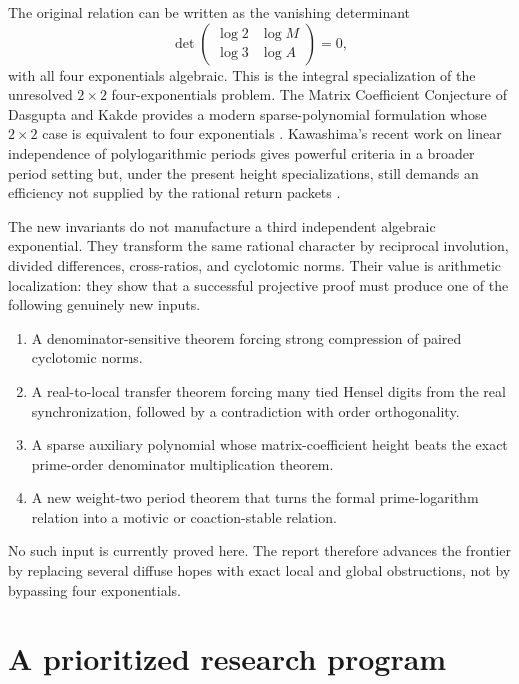 \documentclass[11pt]{article}
\theoremstyle{definition}
\theoremstyle{remark}
\begin{document}
The original relation can be written as the vanishing determinant
\begin{equation}\label{eq:four-exp-matrix}
 \det\begin{pmatrix}
 \log2&\log M\\
 \log3&\log A
 \end{pmatrix}=0,
\end{equation}
with all four exponentials algebraic.  This is the integral specialization of the unresolved $2\times2$ four-exponentials problem.  The Matrix Coefficient Conjecture of Dasgupta and Kakde provides a modern sparse-polynomial formulation whose $2\times2$ case is equivalent to four exponentials \cite{DasguptaKakde}.  Kawashima's recent work on linear independence of polylogarithmic periods gives powerful criteria in a broader period setting but, under the present height specializations, still demands an efficiency not supplied by the rational return packets \cite{Kawashima}.

The new invariants do not manufacture a third independent algebraic exponential.  They transform the same rational character by reciprocal involution, divided differences, cross-ratios, and cyclotomic norms.  Their value is arithmetic localization: they show that a successful projective proof must produce one of the following genuinely new inputs.

\begin{enumerate}
\item A denominator-sensitive theorem forcing strong compression of paired cyclotomic norms.
\item A real-to-local transfer theorem forcing many tied Hensel digits from the real synchronization, followed by a contradiction with order orthogonality.
\item A sparse auxiliary polynomial whose matrix-coefficient height beats the exact prime-order denominator multiplication theorem.
\item A new weight-two period theorem that turns the formal prime-logarithm relation into a motivic or coaction-stable relation.
\end{enumerate}

No such input is currently proved here.  The report therefore advances the frontier by replacing several diffuse hopes with exact local and global obstructions, not by bypassing four exponentials.

\section{A prioritized research program}
\label{sec:program}
\end{document}

